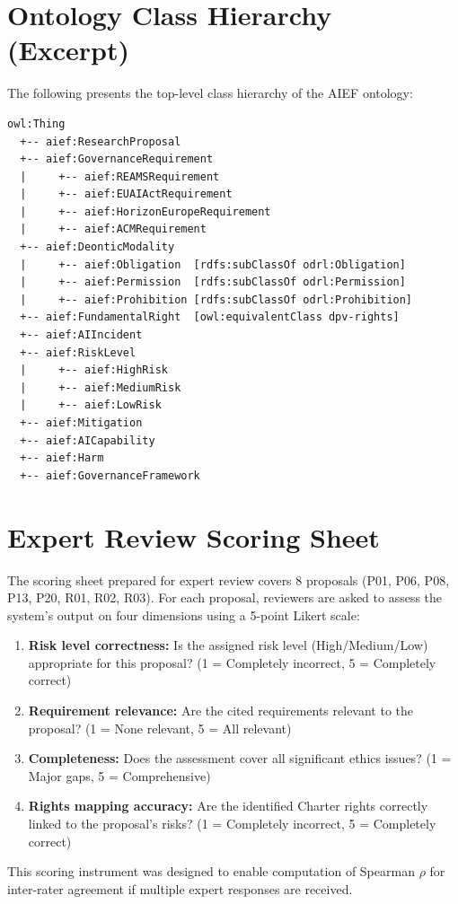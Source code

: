 \section{Ontology Class Hierarchy (Excerpt)}
\label{app:ontology}

The following presents the top-level class hierarchy of the AIEF ontology:

\begin{verbatim}
owl:Thing
  +-- aief:ResearchProposal
  +-- aief:GovernanceRequirement
  |     +-- aief:REAMSRequirement
  |     +-- aief:EUAIActRequirement
  |     +-- aief:HorizonEuropeRequirement
  |     +-- aief:ACMRequirement
  +-- aief:DeonticModality
  |     +-- aief:Obligation  [rdfs:subClassOf odrl:Obligation]
  |     +-- aief:Permission  [rdfs:subClassOf odrl:Permission]
  |     +-- aief:Prohibition [rdfs:subClassOf odrl:Prohibition]
  +-- aief:FundamentalRight  [owl:equivalentClass dpv-rights]
  +-- aief:AIIncident
  +-- aief:RiskLevel
  |     +-- aief:HighRisk
  |     +-- aief:MediumRisk
  |     +-- aief:LowRisk
  +-- aief:Mitigation
  +-- aief:AICapability
  +-- aief:Harm
  +-- aief:GovernanceFramework
\end{verbatim}


\section{Expert Review Scoring Sheet}
\label{app:scoring}

The scoring sheet prepared for expert review covers 8 proposals (P01, P06, P08, P13, P20, R01, R02, R03). For each proposal, reviewers are asked to assess the system's output on four dimensions using a 5-point Likert scale:

\begin{enumerate}
\item \textbf{Risk level correctness:} Is the assigned risk level (High/Medium/Low) appropriate for this proposal? (1 = Completely incorrect, 5 = Completely correct)
\item \textbf{Requirement relevance:} Are the cited requirements relevant to the proposal? (1 = None relevant, 5 = All relevant)
\item \textbf{Completeness:} Does the assessment cover all significant ethics issues? (1 = Major gaps, 5 = Comprehensive)
\item \textbf{Rights mapping accuracy:} Are the identified Charter rights correctly linked to the proposal's risks? (1 = Completely incorrect, 5 = Completely correct)
\end{enumerate}

This scoring instrument was designed to enable computation of Spearman $\rho$ for inter-rater agreement if multiple expert responses are received.
